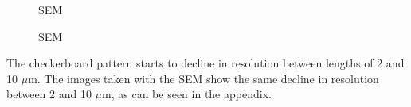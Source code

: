 \begin{figure}[H]
	\centering
	\caption{SEM}
	\label{fig:b2d10_q10}
\end{figure}
\begin{figure}[H]
	\centering
	\caption{SEM}
	\label{fig:b2d10_q11}
\end{figure}

The checkerboard pattern starts to decline in resolution between lengths of 2 and 10 $\mu$m. The images taken with the SEM show the same decline in resolution between 2 and 10 $\mu$m, as can be seen in the appendix.


